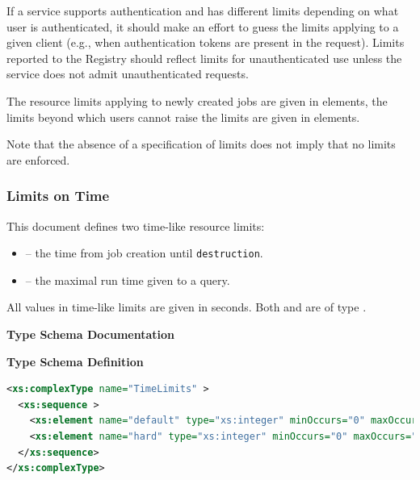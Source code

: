 \documentclass{ivoa}
\begin{document}
If a service supports authentication and has different
limits depending on what user is authenticated, it should make an effort
to guess the limits applying to a given client (e.g., when
authentication tokens are present in the request).  Limits reported to
the Registry should reflect limits for unauthenticated use unless the
service does not admit unauthenticated requests.

The resource limits applying to newly created jobs are given in
 elements, the limits beyond which users cannot
raise the limits are given in  elements.

Note that the absence of a specification of limits does not imply that
no limits are enforced.


\subsubsection{Limits on Time}
This document defines two time-like resource limits:


\begin{itemize}

\item {} -- the time from job creation until
		\texttt{destruction}.{}

\item {} -- the maximal run time given to
		a query.{}

\end{itemize}
All values in time-like limits are given in seconds.  Both 
 and  are of type
.

\begingroup
      	\renewcommand*\descriptionlabel[1]{%
      	\hbox to 5.5em{\emph{#1}\hfil}}\vspace{2ex}\noindent\textbf{ Type Schema Documentation}


\vspace{1ex}\noindent\textbf{ Type Schema Definition}

\begin{lstlisting}[language=XML,basicstyle=\footnotesize]
<xs:complexType name="TimeLimits" >
  <xs:sequence >
    <xs:element name="default" type="xs:integer" minOccurs="0" maxOccurs="1" />
    <xs:element name="hard" type="xs:integer" minOccurs="0" maxOccurs="1" />
  </xs:sequence>
</xs:complexType>
\end{lstlisting}
\end{document}

